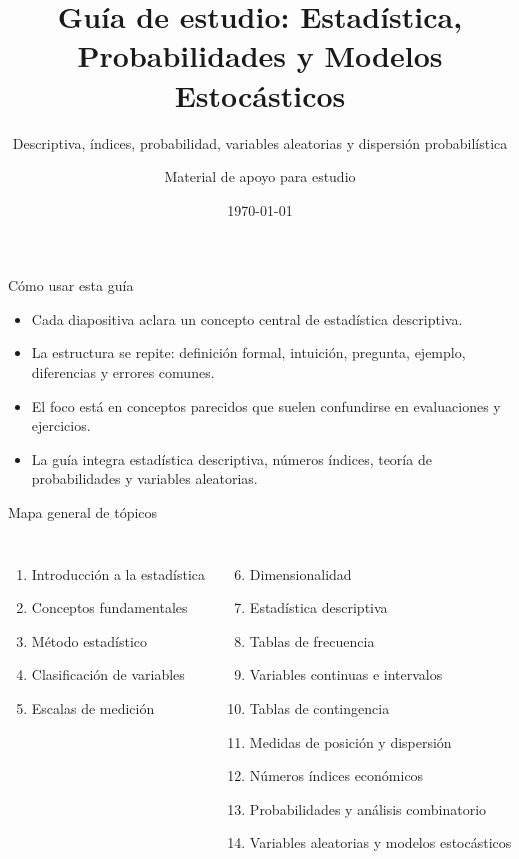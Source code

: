 \documentclass[aspectratio=169,11pt]{beamer}
\title{Guía de estudio: Estadística, Probabilidades y Modelos Estocásticos}
\subtitle{Descriptiva, índices, probabilidad, variables aleatorias y dispersión probabilística}
\author{Material de apoyo para estudio}
\date{\today}
\begin{document}
\begin{frame}
  \titlepage
\end{frame}

\begin{frame}{Cómo usar esta guía}
\begin{itemize}
  \item Cada diapositiva aclara un concepto central de estadística descriptiva.
  \item La estructura se repite: definición formal, intuición, pregunta, ejemplo, diferencias y errores comunes.
  \item El foco está en conceptos parecidos que suelen confundirse en evaluaciones y ejercicios.
  \item La guía integra estadística descriptiva, números índices, teoría de probabilidades y variables aleatorias.
\end{itemize}
\end{frame}

\begin{frame}{Mapa general de tópicos}
\begin{columns}[T]
\begin{enumerate}
  \item Introducción a la estadística
  \item Conceptos fundamentales
  \item Método estadístico
  \item Clasificación de variables
  \item Escalas de medición
\end{enumerate}
\begin{enumerate}\setcounter{enumi}{5}
  \item Dimensionalidad
  \item Estadística descriptiva
  \item Tablas de frecuencia
  \item Variables continuas e intervalos
  \item Tablas de contingencia
  \item Medidas de posición y dispersión
  \item Números índices económicos
  \item Probabilidades y análisis combinatorio
  \item Variables aleatorias y modelos estocásticos
\end{enumerate}
\end{columns}
\end{frame}
\end{document}
